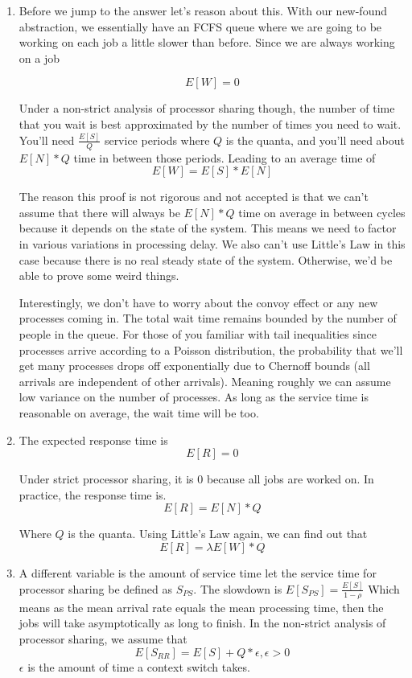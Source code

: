 \begin{enumerate}
  \item Before we jump to the answer let's reason about this.
    With our new-found abstraction, we essentially have an FCFS queue where we are going to be working on each job a little slower than before.
    Since we are always working on a job

    \[
    E[W] = 0
    \]

  Under a non-strict analysis of processor sharing though, the number of time that you wait is best approximated by the number of times you need to wait.
  You'll need $\frac{E[S]}{Q}$ service periods where $Q$ is the quanta, and you'll need about $E[N] * Q$ time in between those periods.
  Leading to an average time of
  \[
  E[W] = E[S] * E[N]
  \]

  The reason this proof is not rigorous and not accepted is that we can't assume that there will always be $E[N] * Q$ time on average in between cycles because it depends on the state of the system.
  This means we need to factor in various variations in processing delay.
  We also can't use Little's Law in this case because there is no real steady state of the system.
  Otherwise, we'd be able to prove some weird things.

  Interestingly, we don't have to worry about the convoy effect or any new processes coming in.
  The total wait time remains bounded by the number of people in the queue.
  For those of you familiar with tail inequalities since processes arrive according to a Poisson distribution, the probability that we'll get many processes drops off exponentially due to Chernoff bounds (all arrivals are independent of other arrivals).
  Meaning roughly we can assume low variance on the number of processes.
  As long as the service time is reasonable on average, the wait time will be too.

\item The expected response time is
  \[
  E[R] = 0
  \]

  Under strict processor sharing, it is 0 because all jobs are worked on.
  In practice, the response time is.
  \[
  E[R] = E[N] * Q
  \]

  Where $Q$ is the quanta.
  Using Little's Law again, we can find out that
  \[
  E[R] = \lambda E[W] * Q
  \]
\item A different variable is the amount of service time let the service time for processor sharing be defined as $S_{PS}$.
  The slowdown is $E[S_{PS}] = \frac{E[S]}{1 - \rho}$
  Which means as the mean arrival rate equals the mean processing time, then the jobs will take asymptotically as long to finish.
  In the non-strict analysis of processor sharing, we assume that
  \[
    E[S_{RR}] = E[S] + Q * \epsilon, \epsilon > 0
  \]
    $\epsilon$ is the amount of time a context switch takes.


\end{enumerate}
